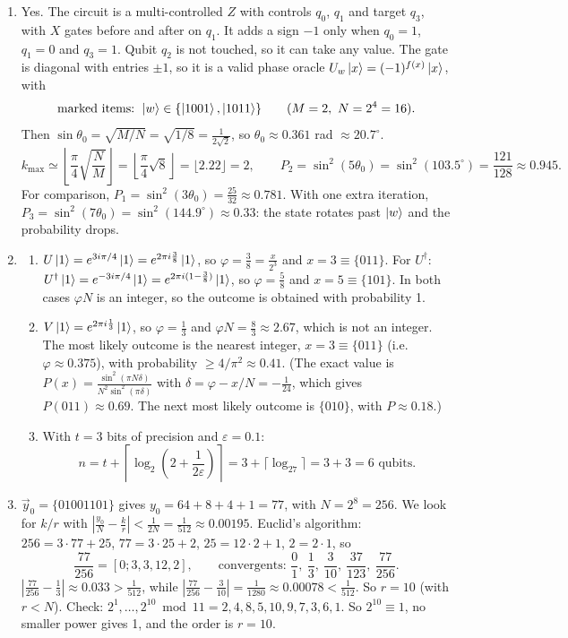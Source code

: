 \documentclass[11pt,a4paper]{article}
\begin{document}
\begin{enumerate}
\item Yes. The circuit is a multi-controlled $Z$ with controls $q_0$, $q_1$ and target $q_3$, with
$X$ gates before and after on $q_1$. It adds a sign $-1$ only when $q_0=1$, $q_1=0$ and $q_3=1$.
Qubit $q_2$ is not touched, so it can take any value. The gate is diagonal with entries $\pm1$, so it is
a valid phase oracle $U_w\ket x=(-1)^{f(x)}\ket x$, with
\[
\text{marked items: }\ket{w}\in\{\ket{1001},\ket{1011}\}\qquad(M=2,\ N=2^4=16).
\]
Then $\sin\theta_0=\sqrt{M/N}=\sqrt{1/8}=\frac1{2\sqrt2}$, so $\theta_0\approx0.361$ rad $\approx20.7^\circ$.
\[
k_{\max}\simeq\left\lfloor\frac\pi4\sqrt{\frac NM}\right\rfloor=\left\lfloor\frac\pi4\sqrt8\right\rfloor=\lfloor2.22\rfloor=2,
\qquad P_2=\sin^2(5\theta_0)=\sin^2(103.5^\circ)=\frac{121}{128}\approx0.945 .
\]
For comparison, $P_1=\sin^2(3\theta_0)=\frac{25}{32}\approx0.781$. With one extra iteration,
$P_3=\sin^2(7\theta_0)=\sin^2(144.9^\circ)\approx0.33$: the state rotates past $\ket w$ and the
probability drops.

\item
\begin{enumerate}[label=(\roman*)]
\item $U\ket1=e^{3i\pi/4}\ket1=e^{2\pi i\frac38}\ket1$, so $\varphi=\frac38=\frac{x}{2^3}$ and
$x=3\equiv\{011\}$. For $U^\dagger$: $U^\dagger\ket1=e^{-3i\pi/4}\ket1=e^{2\pi i(1-\frac38)}\ket1$, so
$\varphi=\frac58$ and $x=5\equiv\{101\}$. In both cases $\varphi N$ is an integer, so the outcome is
obtained with probability 1.
\item $V\ket1=e^{2\pi i\frac13}\ket1$, so $\varphi=\frac13$ and $\varphi N=\frac83\approx2.67$, which is
not an integer. The most likely outcome is the nearest integer, $x=3\equiv\{011\}$ (i.e.\
$\varphi\approx0.375$), with probability $\ge4/\pi^2\approx0.41$. (The exact value is
$P(x)=\frac{\sin^2(\pi N\delta)}{N^2\sin^2(\pi\delta)}$ with $\delta=\varphi-x/N=-\frac1{24}$, which
gives $P(011)\approx0.69$. The next most likely outcome is $\{010\}$, with $P\approx0.18$.)
\item With $t=3$ bits of precision and $\varepsilon=0.1$:
\[
n=t+\left\lceil\log_2\left(2+\frac1{2\varepsilon}\right)\right\rceil=3+\lceil\log_27\rceil=3+3=6\text{ qubits}.
\]
\end{enumerate}

\item $\vec y_0=\{01001101\}$ gives $y_0=64+8+4+1=77$, with $N=2^8=256$. We look for $k/r$ with
$\left|\frac{y_0}N-\frac kr\right|<\frac1{2N}=\frac1{512}\approx0.00195$. Euclid's algorithm:
$256=3\cdot77+25$, $77=3\cdot25+2$, $25=12\cdot2+1$, $2=2\cdot1$, so
\[
\frac{77}{256}=[0;3,3,12,2],\qquad\text{convergents: }\frac01,\ \frac13,\ \frac3{10},\ \frac{37}{123},\ \frac{77}{256}.
\]
$\left|\frac{77}{256}-\frac13\right|\approx0.033>\frac1{512}$, while
$\left|\frac{77}{256}-\frac3{10}\right|=\frac{1}{1280}\approx0.00078<\frac1{512}$. So $r=10$ (with $r<N$).
Check: $2^1,\dots,2^{10}\bmod11=2,4,8,5,10,9,7,3,6,1$. So $2^{10}\equiv1$, no smaller power gives 1,
and the order is $r=10$.


\end{enumerate}
\end{document}
